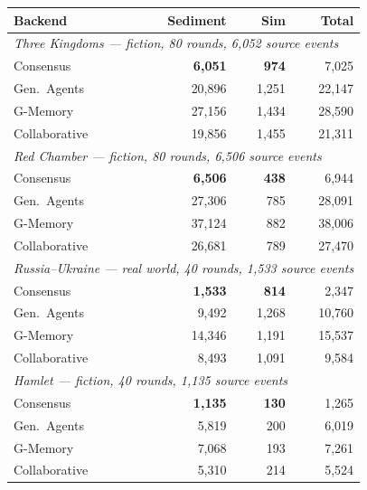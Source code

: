 \begin{tabular}{lrrr}
\toprule
Backend & Sediment & Sim & Total \\
\midrule
\multicolumn{4}{l}{\emph{Three Kingdoms --- fiction, 80 rounds, 6,052 source events}} \\
\quad Consensus & \textbf{6,051} & \textbf{974} & 7,025 \\
\quad Gen.\ Agents & 20,896 & 1,251 & 22,147 \\
\quad G-Memory & 27,156 & 1,434 & 28,590 \\
\quad Collaborative & 19,856 & 1,455 & 21,311 \\
\midrule
\multicolumn{4}{l}{\emph{Red Chamber --- fiction, 80 rounds, 6,506 source events}} \\
\quad Consensus & \textbf{6,506} & \textbf{438} & 6,944 \\
\quad Gen.\ Agents & 27,306 & 785 & 28,091 \\
\quad G-Memory & 37,124 & 882 & 38,006 \\
\quad Collaborative & 26,681 & 789 & 27,470 \\
\midrule
\multicolumn{4}{l}{\emph{Russia--Ukraine --- real world, 40 rounds, 1,533 source events}} \\
\quad Consensus & \textbf{1,533} & \textbf{814} & 2,347 \\
\quad Gen.\ Agents & 9,492 & 1,268 & 10,760 \\
\quad G-Memory & 14,346 & 1,191 & 15,537 \\
\quad Collaborative & 8,493 & 1,091 & 9,584 \\
\midrule
\multicolumn{4}{l}{\emph{Hamlet --- fiction, 40 rounds, 1,135 source events}} \\
\quad Consensus & \textbf{1,135} & \textbf{130} & 1,265 \\
\quad Gen.\ Agents & 5,819 & 200 & 6,019 \\
\quad G-Memory & 7,068 & 193 & 7,261 \\
\quad Collaborative & 5,310 & 214 & 5,524 \\
\bottomrule
\end{tabular}
